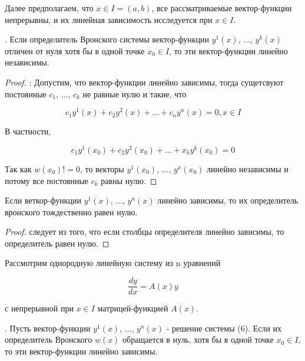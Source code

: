 Далее предполагаем, что $x \in I = (a, b)$, все рассматриваемые вектор-функции непрерывны, и их линейная зависимость исследуется при $x\in I$.

\begin{theorem}. 
    Если определитель Вронского системы вектор-функции $y^1(x)$, ..., $y^k(x)$ отличен от нуля хотя бы в одной точке $x_0\in I$, то эти вектор-функции линейно независимы.
\end{theorem}

\begin{proof}:
Допустим,  что вектор-функции линейно зависимы, тогда сущетсвуют постоянные $c_1$, ..., $c_k$ не равные нулю и такие, что 

\begin{equation}
    c_1y^1(x) + c_2y^2(x) + ... + c_ny^n(x) = 0, x \in I
\end{equation}

В частности,

\begin{equation}
    c_1y^1(x_0) + c_2y^2(x_0) + ... + x_ky^k(x_0) = 0
\end{equation}

Так как $w(x_0)!=0$, то векторы $y^1(x_0)$, ..., $y^x(x_0)$ линейно независимы и потому все постоянные $c_k$ равны нулю.
\end{proof}

\begin{theorem}
Если веткор-функции $y^1(x)$, ..., $y^n(x)$ линейно зависимы, то их определитель вронского тождественно равен нулю.
\end{theorem}

\begin{proof}
следует из того, что если столбцы определителя линейно зависимы, то определитель равен нулю. 
\end{proof}

Рассмотрим однородную линейную систему из n уравнений 

\begin{equation}
    \frac{dy}{dx} = A(x)y
\end{equation}

с непрерывной при $x\in I$ матрицей-функцией $A(x)$.

\begin{theorem}.
Пусть вектор-функции $y^1(x)$, ..., $y^n(x)$ - решение системы (6). Если их определитель Вронского $w(x)$ обращается в нуль, хотя бы в одной точке $x_0\in I$, то эти вектор-функции линейно зависимы.
\end{theorem}

